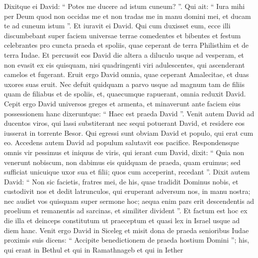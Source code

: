 \begin{biblechapter}
\begin{biblechapter}
\begin{biblechapter}
\begin{biblechapter}
\begin{biblechapter}
\begin{biblechapter}
\begin{biblechapter}
\begin{biblechapter}
\begin{biblechapter}
\begin{biblechapter}
\begin{biblechapter}
\begin{biblechapter}
\begin{biblechapter}
\begin{biblechapter}
\begin{biblechapter}
\begin{biblechapter}
\begin{biblechapter}
\begin{biblechapter}
\begin{biblechapter}
\begin{biblechapter}
\begin{biblechapter}
\begin{biblechapter}
\begin{biblechapter}
\begin{biblechapter}
\begin{biblechapter}
\begin{biblechapter}
\begin{biblechapter}
\begin{biblechapter}
\begin{biblechapter}
\begin{biblechapter}
\verse Dixitque ei David: “ Potes me ducere ad istum cuneum? ”. Qui ait: “ Iura mihi per Deum quod non occidas me et non tradas me in manu domini mei, et ducam te ad cuneum istum ”. Et iuravit ei David.
 \verse Qui cum duxisset eum, ecce illi discumbebant super faciem universae terrae comedentes et bibentes et festum celebrantes pro cuncta praeda et spoliis, quae ceperant de terra Philisthim et de terra Iudae. 
\verse Et percussit eos David die altera a diluculo usque ad vesperam, et non evasit ex eis quisquam, nisi quadringenti viri adulescentes, qui ascenderant camelos et fugerant.
 \verse Eruit ergo David omnia, quae ceperant Amalecitae, et duas uxores suas eruit. 
\verse Nec defuit quidquam a parvo usque ad magnum tam de filiis quam de filiabus et de spoliis, et, quaecumque rapuerant, omnia reduxit David. 
\verse Cepit ergo David universos greges et armenta, et minaverunt ante faciem eius possessionem hanc dixeruntque: “ Haec est praeda David ”.
 \verse Venit autem David ad ducentos viros, qui lassi substiterant nec sequi potuerant David, et residere eos iusserat in torrente Besor. Qui egressi sunt obviam David et populo, qui erat cum eo. Accedens autem David ad populum salutavit eos pacifice. 
\verse Respondensque omnis vir pessimus et iniquus de viris, qui ierant cum David, dixit: “ Quia non venerunt nobiscum, non dabimus eis quidquam de praeda, quam eruimus; sed sufficiat unicuique uxor sua et filii; quos cum acceperint, recedant ”. 
\verse Dixit autem David: “ Non sic facietis, fratres mei, de his, quae tradidit Dominus nobis, et custodivit nos et dedit latrunculos, qui eruperant adversum nos, in manu nostra; 
\verse nec audiet vos quisquam super sermone hoc; aequa enim pars erit descendentis ad proelium et remanentis ad sarcinas, et similiter divident ”. 
\verse Et factum est hoc ex die illa et deinceps constitutum ut praeceptum et quasi lex in Israel usque ad diem hanc.
 \verse Venit ergo David in Siceleg et misit dona de praeda senioribus Iudae proximis suis dicens: “ Accipite benedictionem de praeda hostium Domini ”; 
\verse his, qui erant in Bethul et qui in Ramathnageb et qui in Iether 

\end{biblechapter}
\end{biblechapter}
\end{biblechapter}
\end{biblechapter}
\end{biblechapter}
\end{biblechapter}
\end{biblechapter}
\end{biblechapter}
\end{biblechapter}
\end{biblechapter}
\end{biblechapter}
\end{biblechapter}
\end{biblechapter}
\end{biblechapter}
\end{biblechapter}
\end{biblechapter}
\end{biblechapter}
\end{biblechapter}
\end{biblechapter}
\end{biblechapter}
\end{biblechapter}
\end{biblechapter}
\end{biblechapter}
\end{biblechapter}
\end{biblechapter}
\end{biblechapter}
\end{biblechapter}
\end{biblechapter}
\end{biblechapter}
\end{biblechapter}
